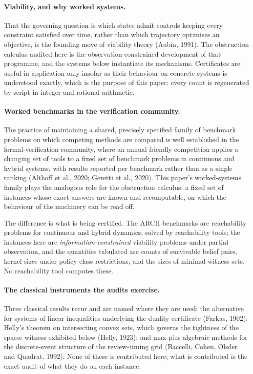 \documentclass[10pt,twocolumn]{article}
\theoremstyle{plain}
\theoremstyle{definition}
\theoremstyle{remark}
\begin{document}
\paragraph{Viability, and why worked systems.} That the governing question is which states
admit controls keeping every constraint satisfied over time, rather than which trajectory
optimises an objective, is the founding move of viability theory (Aubin, 1991). The obstruction
calculus audited here is the observation-constrained development of that programme, and the
systems below instantiate its mechanisms. Certificates are useful in application only insofar
as their behaviour on concrete systems is understood exactly, which is the purpose of this
paper: every count is regenerated by script in integer and rational arithmetic.

\paragraph{Worked benchmarks in the verification community.} The practice of maintaining a
shared, precisely specified family of benchmark problems on which competing methods are
compared is well established in the formal-verification community, where an annual friendly
competition applies a changing set of tools to a fixed set of benchmark problems in continuous
and hybrid systems, with results reported per benchmark rather than as a single ranking
(Althoff et al., 2020; Geretti et al., 2020). This paper's worked-systems family plays the
analogous role for the obstruction calculus: a fixed set of instances whose exact answers are
known and recomputable, on which the behaviour of the machinery can be read off.

The difference is what is being certified. The ARCH benchmarks are reachability problems for
continuous and hybrid dynamics, solved by reachability tools; the instances here are
\emph{information-constrained} viability problems under partial observation, and the quantities
tabulated are counts of survivable belief pairs, kernel sizes under policy-class restrictions,
and the sizes of minimal witness sets. No reachability tool computes these.

\paragraph{The classical instruments the audits exercise.} Three classical results recur and
are named where they are used: the alternative for systems of linear inequalities underlying
the duality certificate (Farkas, 1902); Helly's theorem on intersecting convex sets, which
governs the tightness of the sparse witness exhibited below (Helly, 1923); and max-plus
algebraic methods for the discrete-event structure of the review-timing grid (Baccelli, Cohen,
Olsder and Quadrat, 1992). None of these is contributed here; what is contributed is the exact
audit of what they do on each instance.
\end{document}
